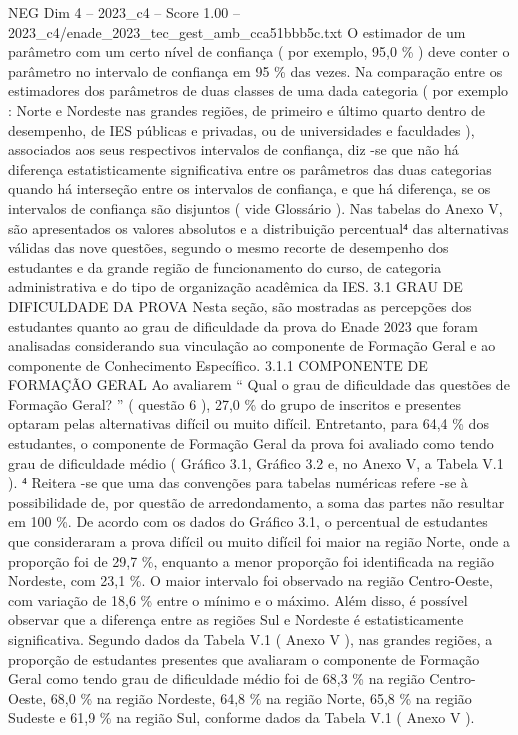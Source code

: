\begin{textsample}{NEG Dim 4 – 2023\_c4 – Score 1.00 – 2023\_c4/enade\_2023\_tec\_gest\_amb\_cca51bbb5c.txt}
O estimador de um parâmetro com um certo nível de confiança ( por exemplo, 95,0 \% ) deve conter o parâmetro no intervalo de confiança em 95 \% das vezes.
Na comparação entre os estimadores dos parâmetros de duas classes de uma dada categoria ( por exemplo : Norte e Nordeste nas grandes regiões, de primeiro e último quarto dentro de desempenho, de IES públicas e privadas, ou de universidades e faculdades ), associados aos seus respectivos intervalos de confiança, diz -se que não há diferença estatisticamente significativa entre os parâmetros das duas categorias quando há interseção entre os intervalos de confiança, e que há diferença, se os intervalos de confiança são disjuntos ( vide Glossário ).
Nas tabelas do Anexo V, são apresentados os valores absolutos e a distribuição percentual⁴ das alternativas válidas das nove questões, segundo o mesmo recorte de desempenho dos estudantes e da grande região de funcionamento do curso, de categoria administrativa e do tipo de organização acadêmica da IES. 3.1 GRAU DE DIFICULDADE DA PROVA Nesta seção, são mostradas as percepções dos estudantes quanto ao grau de dificuldade da prova do Enade 2023 que foram analisadas considerando sua vinculação ao componente de Formação Geral e ao componente de Conhecimento Específico. 3.1.1 COMPONENTE DE FORMAÇÃO GERAL Ao avaliarem “ Qual o grau de dificuldade das questões de Formação Geral? ” ( questão 6 ), 27,0 \% do grupo de inscritos e presentes optaram pelas alternativas difícil ou muito difícil.
Entretanto, para 64,4 \% dos estudantes, o componente de Formação Geral da prova foi avaliado como tendo grau de dificuldade médio ( Gráfico 3.1, Gráfico 3.2 e, no Anexo V, a Tabela V.1 ). ⁴ Reitera -se que uma das convenções para tabelas numéricas refere -se à possibilidade de, por questão de arredondamento, a soma das partes não resultar em 100 \%.
De acordo com os dados do Gráfico 3.1, o percentual de estudantes que consideraram a prova difícil ou muito difícil foi maior na região Norte, onde a proporção foi de 29,7 \%, enquanto a menor proporção foi identificada na região Nordeste, com 23,1 \%.
O maior intervalo foi observado na região Centro-Oeste, com variação de 18,6 \% entre o mínimo e o máximo.
Além disso, é possível observar que a diferença entre as regiões Sul e Nordeste é estatisticamente significativa.
Segundo dados da Tabela V.1 ( Anexo V ), nas grandes regiões, a proporção de estudantes presentes que avaliaram o componente de Formação Geral como tendo grau de dificuldade médio foi de 68,3 \% na região Centro-Oeste, 68,0 \% na região Nordeste, 64,8 \% na região Norte, 65,8 \% na região Sudeste e 61,9 \% na região Sul, conforme dados da Tabela V.1 ( Anexo V ).

\end{textsample}
